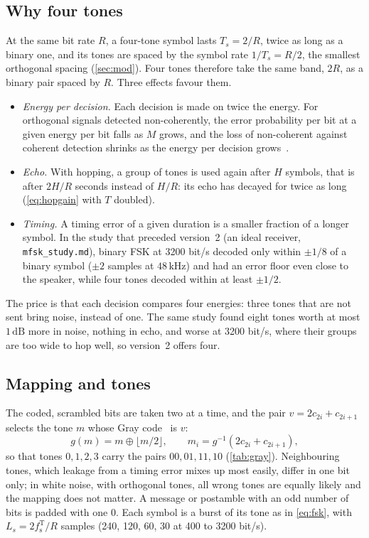 \documentclass[11pt,a4paper]{article}
\newcommand{\kHz}{\,\mathrm{kHz}}
\newcommand{\dB}{\,\mathrm{dB}}
\newcommand{\code}[1]{\texttt{#1}}
\newcommand{\fsT}{f_{\mathrm{s}}^{\mathrm{T}}}
\theoremstyle{remark}
\begin{document}
\subsection{Why four tones}
At the same bit rate $R$, a four-tone symbol lasts $T_s = 2/R$, twice as long as a binary one, and its tones are spaced by the symbol rate $1/T_s = R/2$, the smallest orthogonal spacing (\cref{sec:mod}). Four tones therefore take the same band, $2R$, as a binary pair spaced by $R$. Three effects favour them.
\begin{itemize}
\item \emph{Energy per decision.} Each decision is made on twice the energy. For orthogonal signals detected non-coherently, the error probability per bit at a given energy per bit falls as $M$ grows, and the loss of non-coherent against coherent detection shrinks as the energy per decision grows~\cite{proakis}.
\item \emph{Echo.} With hopping, a group of tones is used again after $H$ symbols, that is after $2H/R$ seconds instead of $H/R$: its echo has decayed for twice as long (\cref{eq:hopgain} with $T$ doubled).
\item \emph{Timing.} A timing error of a given duration is a smaller fraction of a longer symbol. In the study that preceded version~2 (an ideal receiver, \code{mfsk\_study.md}), binary FSK at 3200 bit/s decoded only within $\pm 1/8$ of a binary symbol ($\pm 2$ samples at $48\kHz$) and had an error floor even close to the speaker, while four tones decoded within at least $\pm 1/2$.
\end{itemize}
The price is that each decision compares four energies: three tones that are not sent bring noise, instead of one. The same study found eight tones worth at most $1\dB$ more in noise, nothing in echo, and worse at 3200 bit/s, where their groups are too wide to hop well, so version~2 offers four.

\subsection{Mapping and tones}
The coded, scrambled bits are taken two at a time, and the pair $v = 2c_{2i} + c_{2i+1}$ selects the tone $m$ whose Gray code~\cite{gray} is $v$:
\begin{equation}
g(m) = m \oplus \lfloor m/2 \rfloor, \qquad m_i = g^{-1}(2c_{2i} + c_{2i+1}),
\label{eq:gray}
\end{equation}
so that tones $0, 1, 2, 3$ carry the pairs $00, 01, 11, 10$ (\cref{tab:gray}). Neighbouring tones, which leakage from a timing error mixes up most easily, differ in one bit only; in white noise, with orthogonal tones, all wrong tones are equally likely and the mapping does not matter. A message or postamble with an odd number of bits is padded with one 0. Each symbol is a burst of its tone as in \cref{eq:fsk}, with $L_s = 2\fsT/R$ samples (240, 120, 60, 30 at 400 to 3200 bit/s).
\end{document}
